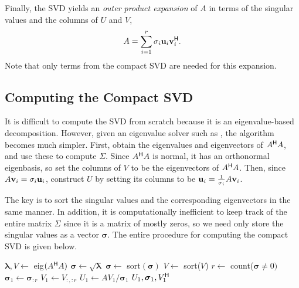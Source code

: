 Finally, the SVD yields an \emph{outer product expansion} of $A$ in terms of the singular values and the columns of $U$ and $V$,
\begin{equation}
\label{eq:svd-outer-product}
A = \sum_{i=1}^r \sigma_i\mathbf{u}_i\mathbf{v}^{\mathsf H}_i.
\end{equation}
Note that only terms from the compact SVD are needed for this expansion.

\subsection*{Computing the Compact SVD} %

It is difficult to compute the SVD from scratch because it is an eigenvalue-based decomposition.
However, given an eigenvalue solver such as , the algorithm becomes much simpler.
First, obtain the eigenvalues and eigenvectors of $A^{\mathsf H} A$, and use these to compute $\Sigma$.
Since $A^{\mathsf H} A$ is normal, it has an orthonormal eigenbasis, so set the columns of $V$ to be the eigenvectors of $A^{\mathsf H} A$.
Then, since $A\mathbf{v}_i = \sigma_i \mathbf{u}_i$, construct $U$ by setting its columns to be $\mathbf{u}_i = \frac{1}{\sigma_i}A\mathbf{v}_i$.

The key is to sort the singular values and the corresponding eigenvectors in the same manner.
In addition, it is computationally inefficient to keep track of the entire matrix $\Sigma$ since it is a matrix of mostly zeros, so we need only store the singular values as a vector $\boldsymbol{\sigma}$.
The entire procedure for computing the compact SVD is given below.

\begin{algorithm} %
\begin{algorithmic}[1]
\State $\boldsymbol{\lambda}, V \gets$ eig$(A^{\mathsf H} A)$
\State $\boldsymbol{\sigma} \gets \sqrt{\boldsymbol{\lambda}}$
\State $\boldsymbol{\sigma} \gets$ sort$(\boldsymbol{\sigma})$
    \label{step:sort-singular-values}
\State $V \gets$ sort($V$)
\State $r \gets $ count($\boldsymbol{\sigma} \ne 0)$
    \label{step:nonzero-singular-values}
\State $\boldsymbol{\sigma}_1 \gets \boldsymbol{\sigma}_{:r}$
\State $V_1 \gets V_{:,:r}$
\State $U_1 \gets AV_1 / \boldsymbol{\sigma}_1$
    \label{step:SVD-construct-U}
\State {} $U_1, \boldsymbol{\sigma}_1, V^{\mathsf H}_1$
\EndProcedure
\caption{}
\label{alg:compact-svd}
\end{algorithmic}
\end{algorithm}

